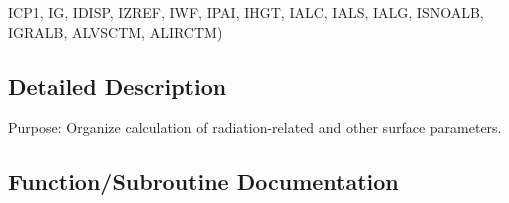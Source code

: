 \begin{DoxyCompactItemize}
I\+C\+P1, I\+G, I\+D\+I\+S\+P, I\+Z\+R\+E\+F, I\+W\+F, I\+P\+A\+I, I\+H\+G\+T, I\+A\+L\+C, I\+A\+L\+S, I\+A\+L\+G, I\+S\+N\+O\+A\+L\+B, I\+G\+R\+A\+L\+B, A\+L\+V\+S\+C\+T\+M, A\+L\+I\+R\+C\+T\+M)
\end{DoxyCompactItemize}


\subsection{Detailed Description}
Purpose\+: Organize calculation of radiation-\/related and other surface parameters. 



\subsection{Function/\+Subroutine Documentation}
\hypertarget{CLASSA_8f_ad4c630143a7ebd581213e2acfaf3643e}{}
